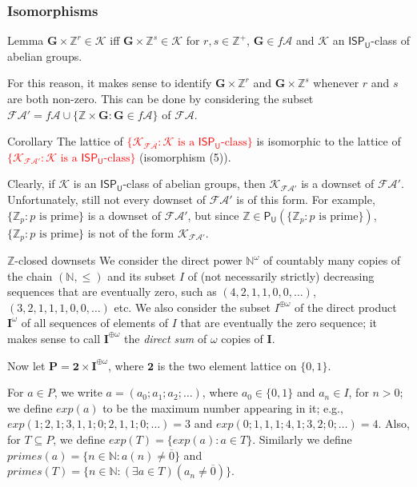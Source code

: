 \documentclass[professionalfont, 10pt]{beamer} %
\theoremstyle{plain}
\theoremstyle{definition}
\newcommand{\m}[1]{{\mathbf {#1} }}
\newcommand{\bb}[1]{\mathbb {#1}}
\begin{document}
\begin{frame}
\frametitle{Isomorphisms}
    \begin{block}{Lemma}
        $\m G \times \mathbb{Z}^r \in \mathcal{K}$ iff $\m G \times \mathbb{Z}^s \in \mathcal{K}$ for $r, s \in \bb{Z}^+$, $\m G \in f\mathcal{A}$ and $\mathcal{K}$ an $\mathsf{ISP_U}$-class of abelian groups.
    \end{block}
    \pause
    For this reason, it makes sense to identify $\m G \times \mathbb{Z}^r$ and $\m G \times \mathbb{Z}^s$ whenever $r$ and $s$ are both non-zero.
    This can be done by considering the subset $\mathcal{FA}' = f\mathcal{A} \cup \{\bb{Z} \times \m G: \m G \in f\mathcal{A}\}$ of $\mathcal{FA}$.
    \pause
    \begin{block}{Corollary}
        The lattice of \textcolor{red}{$\{\mathcal{K}_{\mathcal{FA}}: \mathcal{K} \text{ is a } \mathsf{ISP_U} \text{-class}\}$} is isomorphic to the lattice of \textcolor{red}{$\{\mathcal{K}_{\mathcal{FA}'}: \mathcal{K} \text{ is a } \mathsf{ISP_U} \text{-class}\}$} (isomorphism (5)).
    \end{block}
    \pause
    Clearly, if $\mathcal{K}$ is an $\mathsf{ISP_U}$-class of abelian groups, then $\mathcal{K}_{\mathcal{FA}'}$ is a downset of $\mathcal{FA}'$.
    Unfortunately, still not every downset of $\mathcal{FA}'$ is of this form.
    For example, $\{\bb{Z}_p: p \text{ is prime}\}$ is a downset of $\mathcal{FA}'$, but since $\bb{Z} \in \mathsf{P_U}(\{\bb{Z}_p: p \text{ is prime}\})$, $\{\bb{Z}_p: p \text{ is prime}\}$ is not of the form $\mathcal{K}_{\mathcal{FA}'}$.
\end{frame}

\begin{frame}{$\bb{Z}$-closed downsets}
    We consider the direct power $\bb{N}^\omega$ of countably many copies of the chain $(\mathbb{N}, \leq)$ and its subset $I$ of (not necessarily strictly) decreasing sequences that are eventually zero, such as $(4, 2, 1, 1, 0, 0, \dots)$, $(3, 2, 1, 1, 1, 0, 0, \dots)$ etc.
    We also consider the subset $I^{\oplus \omega}$ of the direct product $\m I^\omega$ of all sequences of elements of $I$ that are eventually the zero sequence; it makes sense to call $\m{I}^{\oplus \omega}$ the \emph{direct sum} of $\omega$ copies of $\m I$.\pause
    
    Now let $\m{P} = \m 2 \times \m I^{\oplus \omega}$, where $\m 2$ is the two element lattice on $\{0,1\}$.\pause
    
    For $a \in P$, we write $a=(a_0; a_1; a_2; \ldots)$, where $a_0 \in \{0, 1\}$ and $a_n \in I$, for $n>0$; we define $exp(a)$ to be the maximum number appearing in it; e.g., $exp(1; 2, 1; 3, 1, 1; 0; 2, 1, 1; 0; \dots)=3$ and $exp(0; 1, 1, 1; 4, 1; 3, 2; 0; \dots)=4$.
    Also, for $T \subseteq P$, we define $exp(T) =\{exp(a): a \in T\}$.
    Similarly we define $primes(a) = \{n \in \bb{N}: a(n) \neq \overline{0}\}$ and $primes(T) = \{n \in \bb{N}: (\exists a \in T)(a_n \neq \overline{0})\}$.
\end{frame}
\end{document}
